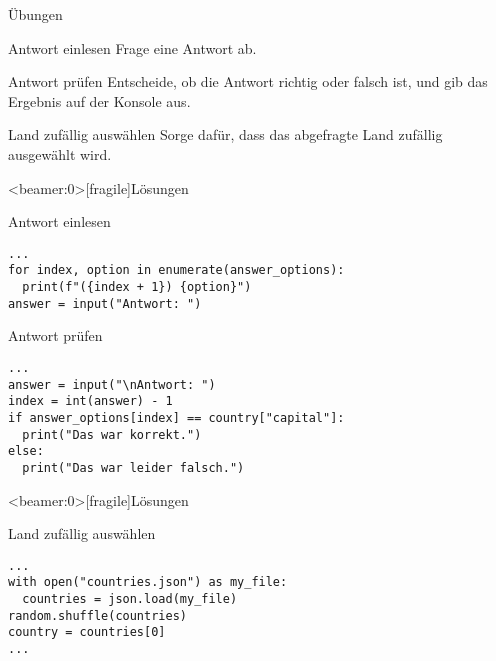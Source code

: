 \begin{frame}{Übungen}
	
	\begin{block}{Antwort einlesen}
		\vspace{2pt}
		Frage eine Antwort ab. 	
	\end{block}
\vspace{12pt}
	
	\begin{block}{Antwort prüfen}
		\vspace{2pt}
		Entscheide, ob die Antwort richtig oder falsch ist, und gib das Ergebnis auf der Konsole aus. 
	\end{block}
\vspace{12pt}
	
	\begin{block}{Land zufällig auswählen}
		\vspace{2pt}
		Sorge dafür, dass das abgefragte Land zufällig ausgewählt wird. 
	\end{block}
	
	
\end{frame}

\begin{frame}<beamer:0>[fragile]{Lösungen}
	
\begin{solutionblock}{Antwort einlesen}
\begin{verbatim}
...
for index, option in enumerate(answer_options):
  print(f"({index + 1}) {option}")
answer = input("Antwort: ")
\end{verbatim}
\end{solutionblock}

\vspace{12pt}

\begin{solutionblock}{Antwort prüfen}
\begin{verbatim}
...
answer = input("\nAntwort: ")
index = int(answer) - 1
if answer_options[index] == country["capital"]:
  print("Das war korrekt.")
else:
  print("Das war leider falsch.")
\end{verbatim}
\end{solutionblock}


\end{frame}

\begin{frame}<beamer:0>[fragile]{Lösungen}
	
\begin{solutionblock}{Land zufällig auswählen}
\begin{verbatim}
...
with open("countries.json") as my_file:
  countries = json.load(my_file)
random.shuffle(countries)
country = countries[0]
...
\end{verbatim}
\end{solutionblock}
\end{frame}


